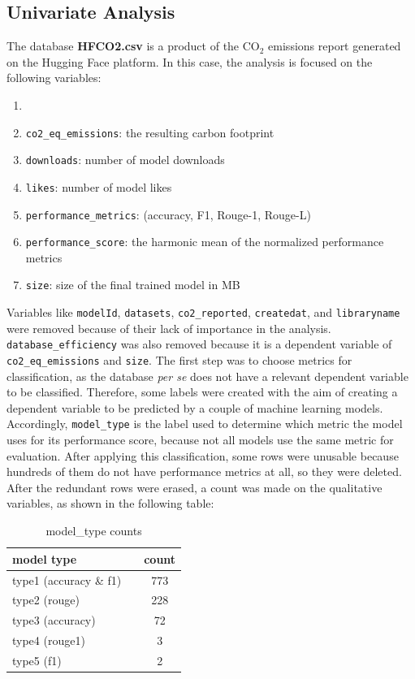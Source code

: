 \documentclass[journal]{IEEEtran}
\begin{document}
	 \subsection{Univariate Analysis}
	 \label{ssec:unianal}
	 The database \textbf{HFCO2.csv} is a product of the $\text{CO}_2$ emissions report generated on the Hugging Face platform. In this case, the analysis is focused on the following variables:

	 \begin{enumerate}
	 	\item[]\hspace{-\labelwidth}\hspace{-\labelsep}
	 	\item \texttt{co2\_eq\_emissions}: the resulting carbon footprint
	 	\item \texttt{downloads}: number of model downloads
	 	\item \texttt{likes}: number of model likes
	 	\item \texttt{performance\_metrics}: (accuracy, F1, Rouge-1, Rouge-L)
	 	\item \texttt{performance\_score}: the harmonic mean of the normalized performance metrics
	 	\item \texttt{size}: size of the final trained model in MB
	 \end{enumerate}
	 Variables like \texttt{modelId}, \texttt{datasets}, \texttt{co2\_reported}, \texttt{createdat}, and \texttt{libraryname} were removed because of their lack of importance in the analysis. \texttt{database\_efficiency} was also removed because it is a dependent variable of \texttt{co2\_eq\_emissions} and \texttt{size}.
	 The first step was to choose metrics for classification, as the database \textit{per se} does not have a relevant dependent variable to be classified. Therefore, some labels were created with the aim of creating a dependent variable to be predicted by a couple of machine learning models. Accordingly, \texttt{model\_type} is the label used to determine which metric the model uses for its performance score, because not all models use the same metric for evaluation. After applying this classification, some rows were unusable because hundreds of them do not have performance metrics at all, so they were deleted.
	 After the redundant rows were erased, a count was made on the qualitative variables, as shown in the following table:



	 \begin{table}[H]
	 	\centering
	 	\caption{model\_type counts}
	 	\begin{tabular}{l c }
	 		\toprule
	 		model type & count \\
	 		\midrule
	 		type1 (accuracy \& f1)  & 773 \\
	 		type2 (rouge)           & 228 \\
	 		type3 (accuracy)        & 72 \\
	 		type4 (rouge1)          & 3 \\
	 		type5 (f1)   			& 2 \\
	 		\bottomrule
	 	\end{tabular}
	 	\label{tab:model_type_counts}
	 \end{table}
\end{document}
